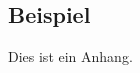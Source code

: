 \begin{appendix}
	
\appendixpage

\chapter{Beispiel}
\label{ch:appendix:example}
Dies ist ein Anhang.

\end{appendix}
